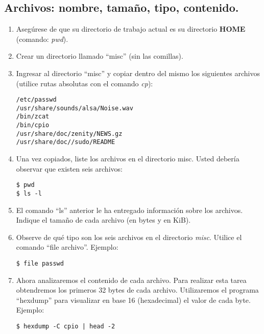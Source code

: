 \documentclass[12pt]{article}
\begin{document}
\subsection{Archivos: nombre, tamaño, tipo, contenido.}

\begin{enumerate}

    \item Asegúrese de que su directorio de trabajo actual es su directorio
        \textbf{HOME} (comando: \emph{pwd}).

    \item Crear un directorio llamado ``misc'' (sin las comillas).

    \item Ingresar al directorio ``misc'' y copiar dentro del mismo los
        siguientes archivos (utilice rutas absolutas con el comando \emph{cp}):

\begin{verbatim}
/etc/passwd
/usr/share/sounds/alsa/Noise.wav
/bin/zcat
/bin/cpio
/usr/share/doc/zenity/NEWS.gz
/usr/share/doc//sudo/README
\end{verbatim}

    \item Una vez copiados, liste los archivos en el directorio misc. Usted
        debería observar que existen seis archivos:

        \begin{verbatim}
$ pwd
$ ls -l
        \end{verbatim}

    \item El comando ``ls'' anterior le ha entregado información sobre los
        archivos.  Indique el tamaño de cada archivo (en bytes y en KiB).

    \item Observe de qué tipo son los seis archivos en el directorio
        \emph{misc}.  Utilice el comando ``file archivo''. Ejemplo:

        \begin{verbatim}
$ file passwd
        \end{verbatim}

    \item Ahora analizaremos el contenido de cada archivo. Para realizar esta
        tarea obtendremos los primeros 32 bytes de cada archivo. Utilizaremos
        el programa ``hexdump'' para visualizar en base 16 (hexadecimal) el
        valor de cada byte. Ejemplo:

        \begin{verbatim}
$ hexdump -C cpio | head -2
        \end{verbatim}


\end{enumerate}
\end{document}
